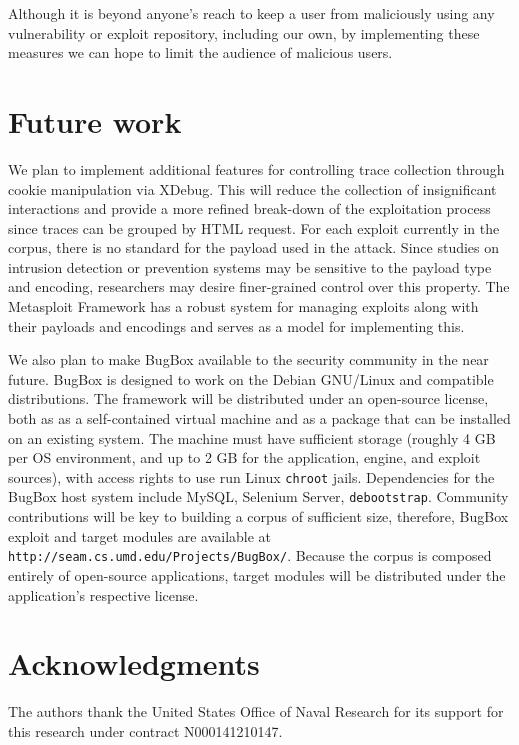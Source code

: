 \documentclass[letterpaper,twocolumn,10pt]{article}
\begin{document}
Although it is beyond anyone's reach to keep a user from maliciously using any vulnerability or exploit repository, including our own, by implementing these measures we can hope to limit the audience of malicious users.

\section{Future work}
We plan to implement additional features for controlling trace collection through cookie manipulation via XDebug. This will reduce the collection of insignificant interactions and provide a more refined break-down of the exploitation process since traces can be grouped by HTML request. For each exploit currently in the corpus, there is no standard for the payload used in the attack. Since studies on intrusion detection or prevention systems may be sensitive to the payload type and encoding, researchers may desire finer-grained control over this property. The Metasploit Framework has a  robust system for managing exploits along with their payloads and encodings and serves as a model for implementing this.

We also plan to make BugBox available to the security community in the near future. BugBox is designed to work on the Debian GNU/Linux and compatible distributions.  The framework will be distributed under an open-source license, both as as a self-contained virtual machine and as a package that can be installed on an existing system. The machine must have sufficient storage (roughly 4 GB per OS environment, and up to 2 GB for the application, engine, and exploit sources), with access rights to use run Linux {\tt chroot} jails.  Dependencies for the BugBox host system include MySQL, Selenium Server, \texttt{debootstrap}. Community contributions will be key to building a corpus of sufficient size, therefore, BugBox exploit and target modules are available at {\tt http://seam.cs.umd.edu/Projects/BugBox/}. Because the corpus is composed entirely of open-source applications, target modules will be distributed under the application's respective license.

\section*{Acknowledgments}

The authors thank the United States Office of Naval Research for its support for this research under contract N000141210147.

{\footnotesize 
}
\end{document}
